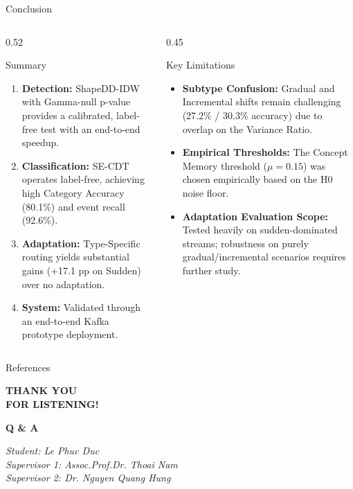\documentclass[aspectratio=169,10pt]{beamer}
\begin{document}
\begin{frame}{Conclusion}
	\begin{columns}[T]
		\begin{column}{0.52\textwidth}
			\begin{block}{\small Summary}
				\footnotesize
				\begin{enumerate}
					\item \textbf{Detection:} ShapeDD-IDW with Gamma-null p-value provides a calibrated, label-free test with an end-to-end speedup.
					\item \textbf{Classification:} SE-CDT operates label-free, achieving high Category Accuracy (80.1\%) and event recall (92.6\%).
					\item \textbf{Adaptation:} Type-Specific routing yields substantial gains (+17.1 pp on Sudden) over no adaptation.
					\item \textbf{System:} Validated through an end-to-end Kafka prototype deployment.
				\end{enumerate}
			\end{block}
		\end{column}
		\begin{column}{0.45\textwidth}
			\begin{alertblock}{\small Key Limitations}
				\footnotesize
				\begin{itemize}
					\item \textbf{Subtype Confusion:} Gradual and Incremental shifts remain challenging (27.2\% / 30.3\% accuracy) due to overlap on the Variance Ratio.
					\item \textbf{Empirical Thresholds:} The Concept Memory threshold ($\mu = 0.15$) was chosen empirically based on the H0 noise floor.
					\item \textbf{Adaptation Evaluation Scope:} Tested heavily on sudden-dominated streams; robustness on purely gradual/incremental scenarios requires further study.
				\end{itemize}
			\end{alertblock}
		\end{column}
	\end{columns}
\end{frame}

\begin{frame}[allowframebreaks]{References}
	\footnotesize
	
	
\end{frame}

\begin{frame}[plain]
	\centering
	\vspace{2cm}
	\Huge \textcolor{univblue}{\textbf{THANK YOU\\FOR LISTENING!}}

	\vspace{1.5cm}
	\Large
	\textbf{Q \& A}

	\vspace{1cm}
	\normalsize
	\textit{Student: Le Phuc Duc \\ Supervisor 1: Assoc.Prof.Dr. Thoai Nam \\ Supervisor 2: Dr. Nguyen Quang Hung}
\end{frame}
\end{document}
